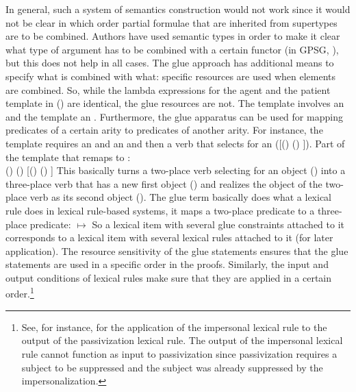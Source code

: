 
In general, such a system of semantics construction would not work since it would not be clear in
which order partial formulae that are inherited from supertypes are to
be combined. Authors have used
semantic types in order to make it clear what type of argument has to be combined with a certain
functor (\eg in GPSG, \citealt[Chapters~9--10]{GKPS85a}), but this does not help in all cases. The glue approach has
additional means to specify what is combined with what: specific resources are used when elements are
combined. So, while the lambda expressions for the agent and the patient template in () are
identical, the glue resources are not. The  template involves an \argone and the 
template an \argtwo. Furthermore, the glue apparatus can be used for mapping predicates of a certain
arity to predicates of another arity. For instance, the  template requires an  and an 
and then a verb that selects for an  ([(\upsig {}) \linimp (\upsig {}) \linimp \Upsig]). 
\ea
Part of the  template that remaps \argtwo to \argthree:\\
(\upsig {}) \linimp (\upsig {}) \linimp {}[(\upsig {}) \linimp (\upsig {}) \linimp \Upsig]
\z
This basically turns a two-place verb selecting for an object (\argtwo) into a three-place verb that
has a new first object (\argtwo) and realizes the object of the two-place verb as its second object
(\argthree). The glue term basically does what a lexical rule does in
lexical rule-based systems, it maps a two-place predicate to a three-place predicate:
\ea
{} $\mapsto$ 
\z
So a lexical item with several glue constraints attached to it corresponds to a lexical item with
several lexical rules attached to it (for later application). The resource sensitivity of the glue statements ensures that
the glue statements are used in a specific order in the proofs. Similarly, the input and output
conditions of lexical rules make sure that they are applied in a certain order.\footnote{%
See, for instance,  for the application of the impersonal lexical rule to the output of the
passivization lexical rule. The output of the impersonal lexical rule cannot function as input to
passivization since passivization requires a subject to be suppressed and the subject was already
suppressed by the impersonalization.}

